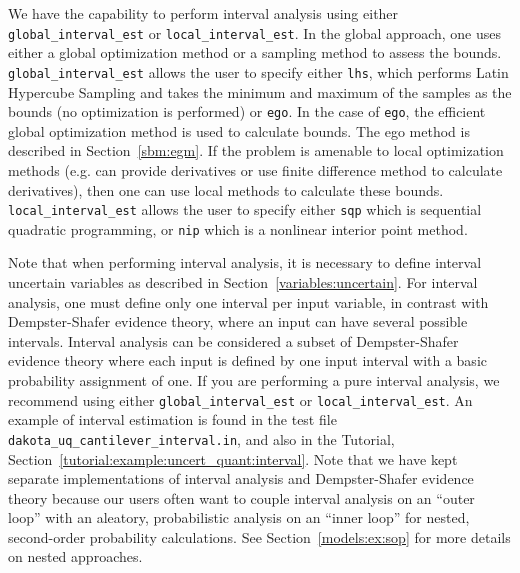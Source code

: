 We have the capability to perform interval analysis using either
\texttt{global\_interval\_est} or \texttt{local\_interval\_est}.
In the global approach, one uses either a global optimization 
method or a sampling method to assess the bounds. 
\texttt{global\_interval\_est}
allows the user to specify either \texttt{lhs}, which performs 
Latin Hypercube Sampling and takes the minimum and maximum of 
the samples as the bounds (no optimization is 
performed) or \texttt{ego}.  In the case of \texttt{ego}, 
the efficient global optimization method is used to calculate 
bounds.  The ego method is described in Section~\ref{sbm:egm}.
If the problem is amenable to local optimization 
methods (e.g. can provide derivatives or use finite difference 
method to calculate derivatives), then one can use local
methods to calculate these bounds.  \texttt{local\_interval\_est}
allows the user to specify either \texttt{sqp} which is sequential 
quadratic programming, or \texttt{nip} which is a nonlinear interior point 
method. 

Note that when performing interval analysis, it is necessary to 
define interval uncertain variables as described in 
Section~\ref{variables:uncertain}.  For interval analysis, 
one must define only one interval per input variable, in 
contrast with Dempster-Shafer evidence theory, where 
an input can have several possible intervals.  Interval 
analysis can be considered a subset of Dempster-Shafer
evidence theory where each input is defined by one 
input interval with a basic probability assignment of one. 
If you are performing a pure interval analysis, we 
recommend using either \texttt{global\_interval\_est} or 
\texttt{local\_interval\_est}.  An example of interval estimation 
is found in the test file \texttt{dakota\_uq\_cantilever\_interval.in}, 
and also in the Tutorial, Section~\ref{tutorial:example:uncert_quant:interval}. 
Note that we have kept separate 
implementations of interval analysis and Dempster-Shafer 
evidence theory because our users often want to couple 
interval analysis on an ``outer loop'' with an aleatory, 
probabilistic analysis on an ``inner loop'' for nested, 
second-order probability calculations.  See Section~\ref{models:ex:sop} 
for more details on nested approaches.


